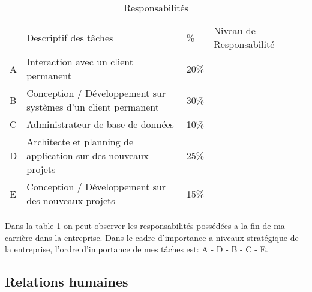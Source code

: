 \documentclass{resume} %
\begin{document}
\newcommand{\uno}{\ding{172}\ }
\newcommand{\dos}{\ding{173}\ }
\newcommand{\tres}{\ding{174}\ }
\newcommand{\cuatro}{\ding{175}\ }

\newcommand{\UNO}{\ding{202}\ }
\newcommand{\DOS}{\ding{203}\ }
\newcommand{\TRES}{\ding{204}\ }
\newcommand{\CUATRO}{\ding{205}\ }


\begin{table}[!htbp]
\label{table-aufiero}
\begin{tabular}{|l|l|l|l|l}
\cline{1-4}
   & Descriptif des tâches &  \% & Niveau de Responsabilité \footnotemark &  \\ \cline{1-4}
 A& Interaction avec un client permanent & 20\% & \uno \dos \tres \CUATRO &  \\ \cline{1-4}
 B& Conception / Développement sur systèmes d'un client permanent & 30\%&  \uno \dos \tres \CUATRO &  \\ \cline{1-4}
 C& Administrateur de base de données  & 10\%  & \uno \dos \TRES \cuatro  &  \\ \cline{1-4}
 D& Architecte et planning de application sur des nouveaux projets & 25\% & \uno \dos \TRES \cuatro &  \\ \cline{1-4}
 E& Conception / Développement sur des nouveaux projets & 15\% &\uno \DOS \tres \cuatro&  \\ \cline{1-4}
\end{tabular}

\caption{Responsabilités}
\end{table}
Dans la table \ref{table-aufiero} on peut observer les responsabilités possédées a la fin de ma carrière dans la entreprise.
Dans le cadre d'importance a niveaux stratégique de la entreprise, l'ordre d'importance de mes tâches est: A - D - B - C - E. 


\subsection{Relations humaines} 
\end{document}

